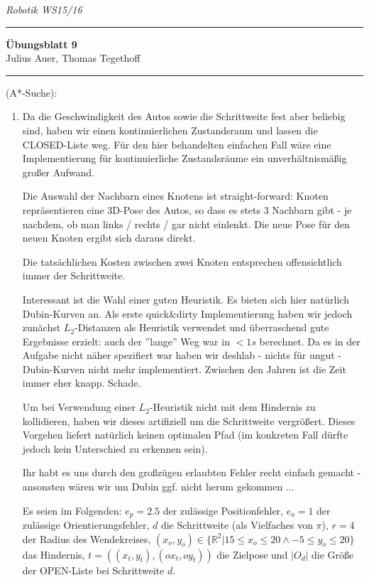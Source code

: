 \documentclass[a4paper, titlepage=false, parskip=full-, 10pt]{scrartcl}
\newcounter{tasknbr}
\newenvironment{task}[1]{{\bf Aufgabe \arabic {tasknbr}\stepcounter{tasknbr}} (#1):\begin{enumerate}}{\end{enumerate}}
\newcommand{\lecture}{Robotik WS15/16}
\newcommand{\tutor}{}
\newcommand{\assignmentnbr}{9}
\newcommand{\students}{Julius Auer, Thomas Tegethoff}
\begin{document}
  
{\small \textsl{\lecture \hfill \tutor}}
\hrule
\begin{center}
\textbf{Übungsblatt \assignmentnbr}\\
[\bigskipamount]
{\small \students}
\end{center}
\hrule

\begin{task}{A*-Suche}
\item[]
Da die Geschwindigkeit des Autos sowie die Schrittweite fest aber beliebig sind, haben wir einen kontinuierlichen Zustandsraum und lassen die CLOSED-Liste weg. Für den hier behandelten einfachen Fall wäre eine Implementierung für kontinuierliche Zustandsräume ein unverhältnismäßig großer Aufwand.

Die Auswahl der Nachbarn eines Knotens ist straight-forward: Knoten repräsentieren eine 3D-Pose des Autos, so dass es stets 3 Nachbarn gibt - je nachdem, ob man links / rechts / gar nicht einlenkt. Die neue Pose für den neuen Knoten ergibt sich daraus direkt.

Die tatsächlichen Kosten zwischen zwei Knoten entsprechen offensichtlich immer der Schrittweite.

Interessant ist die Wahl einer guten Heuristik. Es bieten sich hier natürlich Dubin-Kurven an. Als erste quick\&dirty Implementierung haben wir jedoch zunächst $L_2$-Distanzen als Heuristik verwendet und überraschend gute Ergebnisse erzielt: auch der ''lange'' Weg war in $<1s$ berechnet. Da es in der Aufgabe nicht näher spezifiert war haben wir deshlab - nichts für ungut - Dubin-Kurven nicht mehr implementiert. Zwischen den Jahren ist die Zeit immer eher knapp. Schade.

Um bei Verwendung einer $L_2$-Heuristik nicht mit dem Hindernis zu kollidieren, haben wir dieses artifiziell um die Schrittweite vergrößert. Dieses Vorgehen liefert natürlich keinen optimalen Pfad (im konkreten Fall dürfte jedoch kein Unterschied zu erkennen sein).

Ihr habt es uns durch den großzügen erlaubten Fehler recht einfach gemacht - ansonsten wären wir um Dubin ggf. nicht herum gekommen ...

Es seien im Folgenden: $e_p=2.5$ der zulässige Positionfehler, $e_o=1$ der zulässige Orientierungsfehler, $d$ die Schrittweite (als Vielfaches von $\pi$), $r=4$ der Radius des Wendekreises, $(x_o,y_o)\in\{\mathbb{R}^2|15\le x_o\le20\wedge -5\le y_o\le 20\}$ das Hindernis, $t=((x_t,y_t),(ox_t,oy_t))$ die Zielpose und $|O_d|$ die Größe der OPEN-Liste bei Schrittweite $d$.


\end{task}
\end{document}
